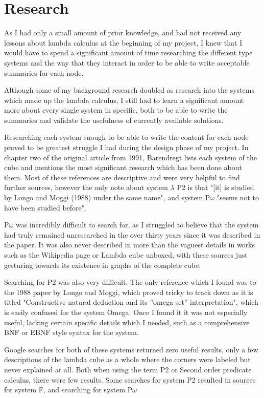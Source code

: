 \documentclass{l4proj}
\begin{document}
\section{Research}

As I had only a small amount of prior knowledge, and had not received any lessons about lambda calculus at the beginning of my project, I knew that I would have to spend a significant amount of time researching the different type systems and the way that they interact in order to be able to write acceptable summaries for each node.

Although some of my background research doubled as research into the systems which made up the lambda calculus, I still had to learn a significant amount more about every single system in specific, both to be able to write the summaries and validate the usefulness of currently available solutions.

Researching each system enough to be able to write the content for each node proved to be greatest struggle I had during the design phase of my project.  In chapter two of the original article from 1991, Barendregt lists each system of the cube and mentions the most significant research which has been done about them.  Most of these references are descriptive and were very helpful to find further sources, however the only note about system $\lambda$ P2 is that "[it] is studied by Longo and Moggi (1988) under the same name", and system P\underline{$\omega$} "seems not to have been studied before".

P\underline{$\omega$} was incredibly difficult to search for, as I struggled to believe that the system had truly remained unresearched in the over thirty years since it was described in the paper.  It was also never described in more than the vaguest details in works such as the Wikipedia page or Lambda cube unboxed, with these sources just gesturing towards its existence in graphs of the complete cube.  

Searching for P2 was also very difficult.  The only reference which I found was to the 1988 paper by Longo and Moggi, which proved tricky to track down as it is titled "Constructive natural deduction and its ”omega-set” interpretation", which is easily confused for the system Omega.  Once I found it it was not especially useful, lacking certain specific details which I needed, such as a comprehensive BNF or EBNF style syntax for the system.

Google searches for both of these systems returned zero useful results, only a few descriptions of the lambda cube as a whole where the corners were labeled but never explained at all.  Both when using the term P2 or Second order predicate calculus, there were few results.  Some searches for system P2 resulted in sources for system F, and searching for system P\underline{$\omega$}
\end{document}
